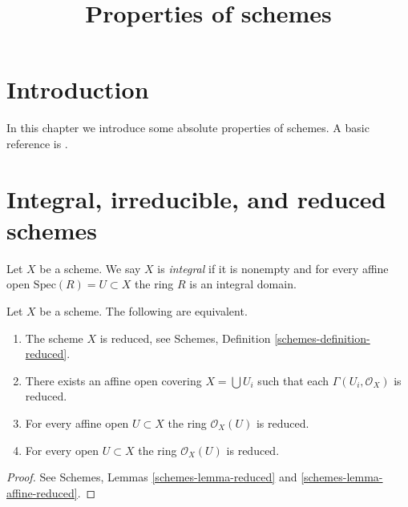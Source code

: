 

%


\title{Properties of schemes}


\maketitle

\label{section-phantom}

\tableofcontents

\section{Introduction}
\label{section-introduction}

\noindent
In this chapter we introduce some absolute properties of schemes.
A basic reference is \cite{EGA}.





\section{Integral, irreducible, and reduced schemes}
\label{section-integral}

\begin{definition}
\label{definition-integral}
Let $X$ be a scheme. We say $X$ is {\it integral} if it is nonempty and
for every affine open $\text{Spec}(R) = U \subset X$ the ring $R$ is an
integral domain.
\end{definition}

\begin{lemma}
\label{lemma-characterize-reduced}
Let $X$ be a scheme.
The following are equivalent.
\begin{enumerate}
\item The scheme $X$ is reduced, see
Schemes, Definition \ref{schemes-definition-reduced}.
\item There exists an affine open covering $X = \bigcup U_i$
such that each $\Gamma(U_i, \mathcal{O}_X)$ is reduced.
\item For every affine open $U \subset X$ the ring
$\mathcal{O}_X(U)$ is reduced.
\item For every open $U \subset X$ the ring $\mathcal{O}_X(U)$ is reduced.
\end{enumerate}
\end{lemma}

\begin{proof}
See Schemes, Lemmas \ref{schemes-lemma-reduced} and
\ref{schemes-lemma-affine-reduced}.
\end{proof}

